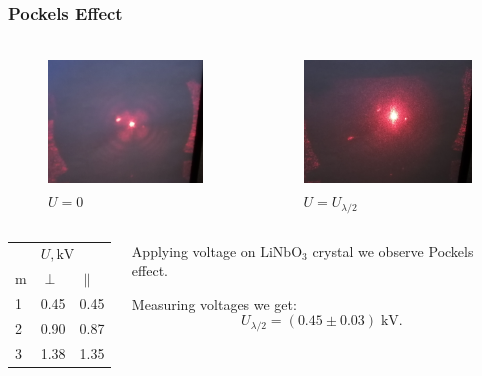 \documentclass{beamer}
\begin{document}
	\begin{frame}
		\frametitle{Pockels Effect}
		
		\begin{columns}
			\begin{column}{0.5\textwidth}
				\begin{figure}
					\centering
					\includegraphics[height=3.5cm]{res/u_0.jpg}
					\vspace{-10pt}
					\caption{\footnotesize  $U = 0$}
				\end{figure}
			
			\end{column}
			\begin{column}{0.5\textwidth}
				\begin{figure}
					\centering
					\includegraphics[height=3.5cm]{res/u_l_2.jpg}
					\vspace{-10pt}
					\caption{\footnotesize  $U = U_{\lambda/2}$}
				\end{figure}
			\end{column}
		\end{columns}
	
		\begin{columns}
			\begin{column}{0.4\textwidth}
				\begin{table}[]
					\begin{tabular}{lll}
						\hline
						& \multicolumn{2}{l}{$U, \text{kV}$} \\
						m & $\perp$    & $\parallel$    \\ \hline
						1 & 0.45         & 0.45             \\
						2 & 0.90         & 0.87             \\
						3 & 1.38         & 1.35             \\ \hline
					\end{tabular}
				\end{table}
			\end{column}
		
			\begin{column}{0.6\textwidth}
				Applying voltage on $\text{LiNbO}_3$ crystal we observe Pockels effect.
				
				Measuring voltages we get:
				$$U_{\lambda/2} = (0.45 \pm 0.03)\; \text{kV}.$$
			\end{column}
		\end{columns}

	\end{frame}
\end{document}
